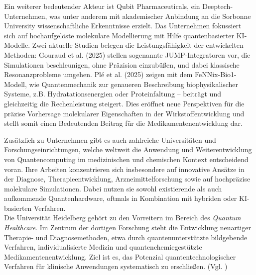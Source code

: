 Ein weiterer bedeutender Akteur ist Qubit Pharmaceuticals, ein Deeptech-Unternehmen, was unter anderem mit akademischer Anbindung an die Sorbonne University wissenschaftliche Erkenntnisse erzielt. Das Unternehmen fokussiert sich auf hochaufgelöste molekulare Modellierung mit Hilfe quantenbasierter KI-Modelle. Zwei aktuelle Studien belegen die Leistungsfähigkeit der entwickelten Methoden: Gouraud et al. (2025) stellen sogenannte JUMP-Integratoren vor, die Simulationen beschleunigen, ohne Präzision einzubüßen, und dabei klassische Resonanzprobleme umgehen. Plé et al. (2025) zeigen mit dem FeNNix-Bio1-Modell, wie Quantenmechanik zur genaueren Beschreibung biophysikalischer Systeme, z.B. Hydratationsenergien oder Proteinfaltung – beiträgt und gleichzeitig die Rechenleistung steigert. Dies eröffnet neue Perspektiven für die präzise Vorhersage molekularer Eigenschaften in der Wirkstoffentwicklung und stellt somit einen Bedeutenden Beitrag für die Medikamentenentwicklung dar. 


Zusätzlich zu Unternehmen gibt es auch zahlreiche Universitäten und Forschungseinrichtungen, welche weltweit die Anwendung und Weiterentwicklung von Quantencomputing im medizinischen und chemischen Kontext entscheidend voran. Ihre Arbeiten konzentrieren sich insbesondere auf innovative Ansätze in der Diagnose, Therapieentwicklung, Arzneimittelforschung sowie auf hochpräzise molekulare Simulationen. Dabei nutzen sie sowohl existierende als auch aufkommende Quantenhardware, oftmals in Kombination mit hybriden oder KI-basierten Verfahren. \\

Die Universität Heidelberg gehört zu den Vorreitern im Bereich des \textit{Quantum Healthcare}. Im Zentrum der dortigen Forschung steht die Entwicklung neuartiger Therapie- und Diagnosemethoden, etwa durch quantenunterstützte bildgebende Verfahren, individualisierte Medizin und quantenchemiegestützte Medikamentenentwicklung. Ziel ist es, das Potenzial quantentechnologischer Verfahren für klinische Anwendungen systematisch zu erschließen. (Vgl. \cite{noauthor_hgsfp_nodate})\\

